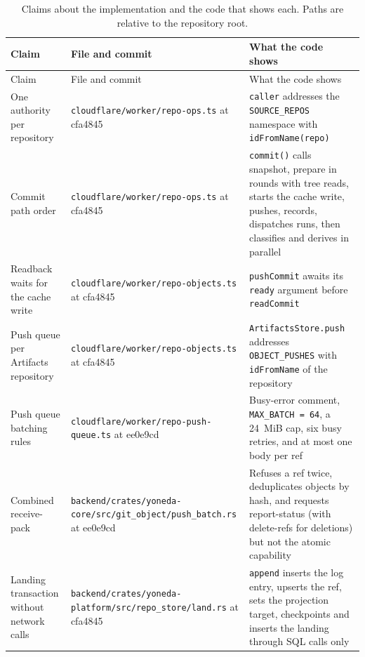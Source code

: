 \documentclass[11pt,letterpaper]{article}
\theoremstyle{definition}
\theoremstyle{remark}
\begin{document}
{\footnotesize
\begin{longtable}{@{}L{3.0cm}L{5.3cm}L{7.2cm}@{}}
\caption{Claims about the implementation and the code that shows each. Paths are relative to the repository root.}
\label{tab:sgoc:evidence}\\
\toprule
Claim & File and commit & What the code shows \\
\midrule
\endfirsthead
\toprule
Claim & File and commit & What the code shows \\
\midrule
\endhead
\bottomrule
\endlastfoot
One authority per repository & \nolinkurl{cloudflare/worker/repo-ops.ts} \newline at cfa4845 & \texttt{caller} addresses the \texttt{SOURCE\_REPOS} namespace with \texttt{idFromName(repo)} \\
Commit path order & \nolinkurl{cloudflare/worker/repo-ops.ts} \newline at cfa4845 & \texttt{commit()} calls snapshot, prepare in rounds with tree reads, starts the cache write, pushes, records, dispatches runs, then classifies and derives in parallel \\
Readback waits for the cache write & \nolinkurl{cloudflare/worker/repo-objects.ts} \newline at cfa4845 & \texttt{pushCommit} awaits its \texttt{ready} argument before \texttt{readCommit} \\
Push queue per Artifacts repository & \nolinkurl{cloudflare/worker/repo-objects.ts} \newline at cfa4845 & \texttt{ArtifactsStore.push} addresses \texttt{OBJECT\_PUSHES} with \texttt{idFromName} of the repository \\
Push queue batching rules & \nolinkurl{cloudflare/worker/repo-push-queue.ts} \newline at ee0e9cd & Busy-error comment, \texttt{MAX\_BATCH = 64}, a 24~MiB cap, six busy retries, and at most one body per ref \\
Combined receive-pack & \nolinkurl{backend/crates/yoneda-core/src/git_object/push_batch.rs} \newline at ee0e9cd & Refuses a ref twice, deduplicates objects by hash, and requests report-status (with delete-refs for deletions) but not the atomic capability \\
Landing transaction without network calls & \nolinkurl{backend/crates/yoneda-platform/src/repo_store/land.rs} \newline at cfa4845 & \texttt{append} inserts the log entry, upserts the ref, sets the projection target, checkpoints and inserts the landing through SQL calls only \\

\end{longtable}}
\end{document}
